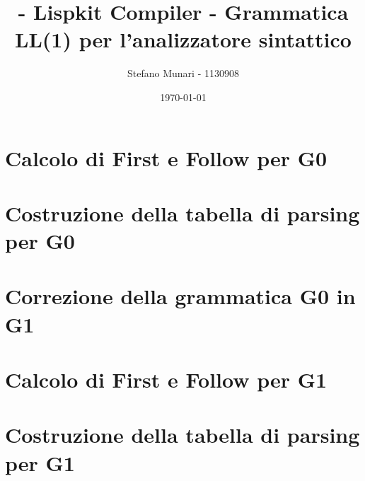\documentclass[12pt]{article}
\title{ - Lispkit Compiler - \linebreak
\textbf{Grammatica LL(1) per l'analizzatore sintattico}
}
\author{Stefano Munari - 1130908}
\date{\today}
\begin{document}
\maketitle
\newpage
\tableofcontents
\newpage

\section{Calcolo di First e Follow per G0}


\section{Costruzione della tabella di parsing per G0}


\section{Correzione della grammatica G0 in G1}


\section{Calcolo di First e Follow per G1}


\section{Costruzione della tabella di parsing per G1}

\end{document}
